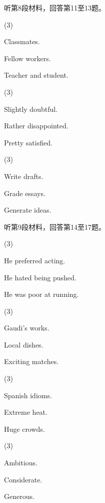 \documentclass{英语试卷}
\begin{document}
\par 听第8段材料，回答第11至13题。\par
{}
\begin{choices}(3)
  \item Classmates.
  \item Fellow workers.
  \item Teacher and student.
\end{choices}
\begin{choices}(3)
  \item Slightly doubtful.
  \item Rather disappointed.
  \item Pretty satisfied.
\end{choices}
\begin{choices}(3)
  \item Write drafts.
  \item Grade essays.
  \item Generate ideas.
\end{choices}
\par 听第9段材料，回答第14至17题。\par
{}
\begin{choices}(3)
  \item He preferred acting.
  \item He hated being pushed.
  \item He was poor at running.
\end{choices}
\begin{choices}(3)
  \item Gaudi's works.
  \item Local dishes.
  \item Exciting matches.
\end{choices}
\begin{choices}(3)
  \item Spanish idioms.
  \item Extreme heat.
  \item Huge crowds.
\end{choices}
\begin{choices}(3)
  \item Ambitious.
  \item Considerate.
  \item Generous.
\end{choices}
\end{document}

